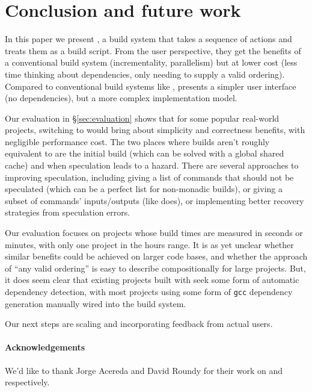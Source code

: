 \section{Conclusion and future work}
\label{sec:conclusion}

In this paper we present \Rattle, a build system that  takes a sequence of actions and treats them as a build script. From the user perspective, they get the benefits of a conventional build system (incrementality, parallelism) but at lower cost (less time thinking about dependencies, only needing to supply a valid ordering). Compared to conventional build systems like \Make,  \Rattle presents a simpler user interface (no dependencies), but a more complex implementation model.

Our evaluation in \S\ref{sec:evaluation} shows that for some popular real-world projects, switching to \Rattle would bring about simplicity and correctness benefits, with negligible performance cost. The two places where builds aren't roughly equivalent to \Make are the initial build (which can be solved with a global shared cache) and when speculation leads to a hazard. There are several approaches to improving speculation, including giving \Rattle a list of commands that should not be speculated (which can be a perfect list for non-monadic builds), or giving \Rattle a subset of commands' inputs/outputs (like \Fac does), or implementing better recovery strategies from speculation errors.

Our evaluation focuses on projects whose build times are measured in seconds or minutes, with only one project in the hours range. It is as yet unclear whether similar benefits could be achieved on larger code bases, and whether the \Rattle approach of ``any valid ordering'' is easy to describe compositionally for large projects. But, it does seem clear that existing projects built with \Make seek some form of automatic dependency detection, with most projects using some form of \texttt{gcc} dependency generation manually wired into the build system.

Our next steps are scaling \Rattle and incorporating feedback from actual users.

\paragraph{Acknowledgements} We'd like to thank Jorge Acereda and David Roundy for their work on \Fsatrace and \Bigbro respectively.
